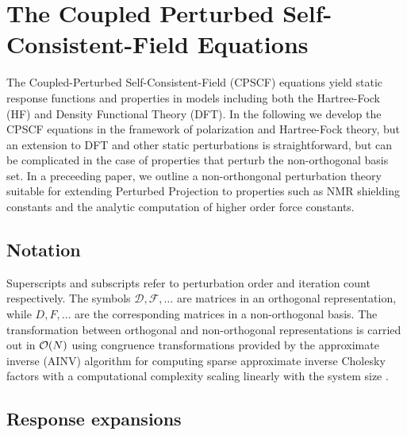 \documentclass[prl,aps,letterpaper,twocolumn,showpacs,twocolumngrid,superbib]{revtex4}
\begin{document}
\newpage

\section{The Coupled Perturbed Self-Consistent-Field Equations}

The Coupled-Perturbed Self-Consistent-Field (CPSCF) equations yield
static response functions and properties in models including both the 
Hartree-Fock (HF) and Density Functional Theory (DFT).  In the following
we develop the CPSCF equations in the framework of polarization and 
Hartree-Fock theory, but an extension to DFT and other static perturbations 
is straightforward, but can be complicated in the case of properties that 
perturb the non-orthogonal basis set.  In a preceeding paper, we outline 
a non-orthongonal perturbation theory suitable for extending Perturbed Projection
to properties such as NMR shielding constants and the analytic computation of
higher order force constants.

\subsection{Notation}

Superscripts and subscripts refer to perturbation order and 
iteration count respectively. The symbols $\mathcal{D},\mathcal{F},\dots$
are matrices in an orthogonal representation, while
$D,F,\dots$ are the corresponding matrices in a non-orthogonal basis.
The transformation between orthogonal and non-orthogonal 
representations is carried out in ${\cal O}(N)$ using
congruence transformations \cite{JWilkinson65,GStewart73} provided 
by the approximate inverse (AINV) algorithm for computing  sparse 
approximate inverse Cholesky factors with a computational complexity
scaling linearly with the system size \cite{MBenzi95,MBenzi96,MBenzi01}.

\newpage

\subsection{Response expansions}
\end{document}
